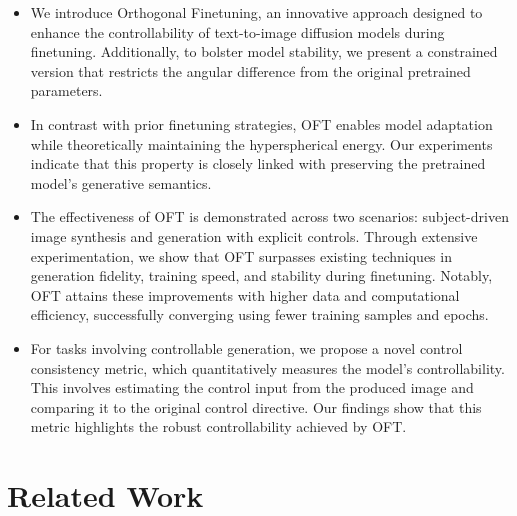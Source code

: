 \begin{itemize}[leftmargin=*,nosep]

    \item We introduce Orthogonal Finetuning, an innovative approach designed to enhance the controllability of text-to-image diffusion models during finetuning. Additionally, to bolster model stability, we present a constrained version that restricts the angular difference from the original pretrained parameters.
    \item In contrast with prior finetuning strategies, OFT enables model adaptation while theoretically maintaining the hyperspherical energy. Our experiments indicate that this property is closely linked with preserving the pretrained model's generative semantics.
    \item The effectiveness of OFT is demonstrated across two scenarios: subject-driven image synthesis and generation with explicit controls. Through extensive experimentation, we show that OFT surpasses existing techniques in generation fidelity, training speed, and stability during finetuning. Notably, OFT attains these improvements with higher data and computational efficiency, successfully converging using fewer training samples and epochs.
    \item For tasks involving controllable generation, we propose a novel control consistency metric, which quantitatively measures the model's controllability. This involves estimating the control input from the produced image and comparing it to the original control directive. Our findings show that this metric highlights the robust controllability achieved by OFT.
\end{itemize}

\section{Related Work}

